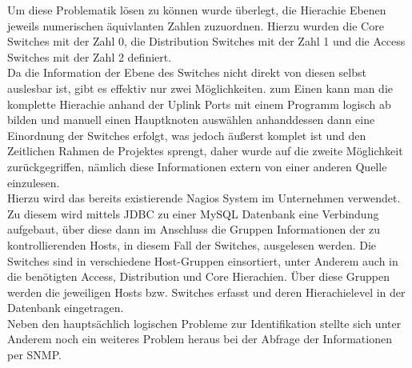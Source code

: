 Um diese Problematik lösen zu können wurde überlegt, die Hierachie Ebenen jeweils numerischen äquivlanten Zahlen zuzuordnen. Hierzu wurden die Core Switches mit der Zahl 0, die Distribution Switches mit der Zahl 1 und die Access Switches mit der Zahl 2 definiert.\\
Da die Information der Ebene des Switches nicht direkt von diesen selbst auslesbar ist, gibt es effektiv nur zwei Möglichkeiten. zum Einen kann man die komplette Hierachie anhand der Uplink Ports mit einem Programm logisch ab bilden und manuell einen Hauptknoten auswählen anhanddessen dann eine Einordnung der Switches erfolgt, was jedoch äußerst komplet ist und den Zeitlichen Rahmen de Projektes sprengt, daher wurde auf die zweite Möglichkeit zurückgegriffen, nämlich diese Informationen extern von einer anderen Quelle einzulesen.\\
Hierzu wird das bereits existierende Nagios System im Unternehmen verwendet. Zu diesem wird mittels JDBC zu einer MySQL Datenbank eine Verbindung aufgebaut, über diese dann im Anschluss die Gruppen Informationen der zu kontrollierenden Hosts, in diesem Fall der Switches, ausgelesen werden. Die Switches sind in verschiedene Host-Gruppen einsortiert, unter Anderem auch in die benötigten Access, Distribution und Core Hierachien. Über diese Gruppen werden die jeweiligen Hosts bzw. Switches erfasst und deren Hierachielevel in der Datenbank eingetragen.\\
Neben den hauptsächlich logischen Probleme zur Identifikation stellte sich unter Anderem noch ein weiteres Problem heraus bei der Abfrage der Informationen per SNMP.\\
